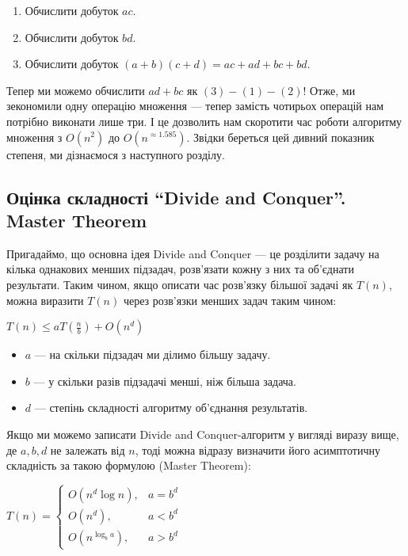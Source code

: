 \documentclass[12pt,a4paper]{report}
\begin{document}
\begin{enumerate}
    \item Обчислити добуток \(ac\).
    \item Обчислити добуток \(bd\).
    \item Обчислити добуток \((a + b)(c + d) = ac + ad + bc + bd\).
\end{enumerate}

Тепер ми можемо обчислити \(ad + bc\) як \((3) - (1) - (2)\)!
Отже, ми зекономили одну операцію множення --- тепер замість чотирьох операцій нам потрібно виконати лише три. І це дозволить нам скоротити час роботи алгоритму множення з \(O(n ^ 2)\) до \(O(n ^ {\approx 1.585})\). Звідки береться цей дивний показник степеня, ми дізнаємося з наступного розділу.


\subsection{Оцінка складності ``Divide and Conquer''. Master Theorem}

Пригадаймо, що основна ідея Divide and Conquer --- це розділити задачу на кілька однакових менших підзадач, розв’язати кожну з них та об’єднати результати. Таким чином, якщо описати час розв’язку більшої задачі як \(T(n)\), можна виразити \(T(n)\) через розв’язки менших задач таким чином:

\begin{center}
\begin{math}
T(n) \leq a T \left(\frac{n}{b}\right) + O(n ^ d)
\end{math}
\end{center}

\begin{itemize}
    \item \(a\) --- на скільки підзадач ми ділимо більшу задачу.
    \item \(b\) --- у скільки разів підзадачі менші, ніж більша задача.
    \item \(d\) --- степінь складності алгоритму об’єднання результатів.
\end{itemize}

Якщо ми можемо записати Divide and Conquer-алгоритм у вигляді виразу вище, де \(a, b, d\) не залежать від \(n\), тоді можна відразу визначити його асимптотичну складність за такою формулою (Master Theorem):

\begin{center}
\begin{math}
T(n) = 
    \begin{cases}
        O(n ^ d \log n),      & a = b ^ d \\
        O(n ^ d),             & a < b ^ d \\
        O(n ^ {\log_b a}),    & a > b ^ d
    \end{cases}
\end{math}
\end{center}
\end{document}
